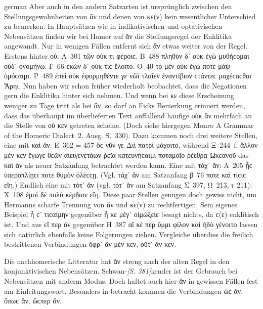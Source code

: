 \begin{otherlanguage*}{german}
Aber auch in den andern Satzarten ist ursprünglich zwischen den Stellungsgewohnheiten von ἄν und denen von κε(ν) kein wesentlicher Unterschied zu bemerken. In Hauptsätzen wie in indikativischen und optativischen Nebensätzen finden wir bei Homer auf ἄν die Stellungsregel der Enklitika angewandt. Nur in wenigen Fällen entfernt sich ἄν etwas weiter von der Regel. Erstens hinter οὐ: Α~301 τῶν οὐκ  τι φέροιϲ. Β~488 πληθὺν δ᾽ οὐκ  ἐγὼ μυθήϲομαι οὐδ᾽ ὀνομήνω. Γ~66 ἑκὼν δ᾽ οὐκ  τιϲ ἕλοιτο. Ο~40 τὸ μὲν οὐκ  ἐγώ ποτε μὰψ ὀμόϲαιμι. Ρ~489 ἐπεὶ οὐκ  ἐφορμηθέντε γε νῶϊ τλαῖεν ἐναντίβιον ϲτάντεϲ μαχέϲαϲθαι Ἄρηι. Nun haben wir schon früher wiederholt beobachtet, dass die Negationen gern die Enklitika hinter sich nehmen. Und wenn bei κε diese Erscheinung weniger zu Tage tritt als bei ἄν, so darf an Ficks Bemerkung erinnert werden, dass das überhaupt im überlieferten Text auffallend häufige οὐκ ἄν mehrfach an die Stelle von οὔ κεν getreten scheine. (Doch siehe hiergegen Monro A Grammar of the Homeric Dialect~2. Ausg. S.~330). Dazu kommen noch drei weitere Stellen, eine mit καὶ ἄν: Ε~362 = 457 ὃϲ νῦν γε  Διὶ πατρὶ μάχοιτο, während Ξ~244~f. ἄλλον μέν κεν ἔγωγε θεῶν αἰειγενετάων ῥεῖα κατευνήϲαιμι  ποταμοῖο ῥέεθρα Ὠκεανοῦ das καὶ ἄν als neuer Satzanfang betrachtet werden kann. Eine mit τάχ᾽ ἄν: Α~205 ᾗϲ ὑπεροπλίῃϲι  ποτε θυμὸν ὀλέϲϲῃ. (Vgl. τάχ᾽ ἄν am Satzanfang β~76  ποτε καὶ τίϲιϲ εἴη.) Endlich eine mit τότ᾽ ἄν (vgl. τότ᾽ ἄν am Satzanfang Σ~397, Ω~213, ι~211): Χ~108 ἐμοὶ δὲ  πολὺ κέρδιον εἴη. Diese paar Stellen genügen doch gewiss nicht, um Hermanns scharfe Trennung von ἄν und κε(ν) zu rechtfertigen. Sein eigenes Beispiel ἦ ϲ᾽  τιϲαίμην gegenüber ἦ κε μέγ᾽ οἰμώξειε besagt nichts, da ϲ(ε) enklitisch ist. Und aus εἴ περ ἄν gegenüber Η~387 αἴ κέ περ ὔμμι φίλον καὶ ἡδὺ γένοιτο lassen sich natürlich ebenfalls keine Folgerungen ziehen. Vergleiche überdies die freilich bestrittenen Verbindungen ὄφρ᾽ ἂν μέν κεν, οὔτ᾽ ἄν κεν.

Die nachhomerische Litteratur hat ἄν streng nach der alten Regel in den konjunktivischen Nebensätzen. Schwan-\hypertarget{p381}{\emph{[S. 381]}}\label{p381}kender ist der Gebrauch bei Nebensätzen mit anderm Modus. Doch haftet auch hier ἄν in gewissen Fällen fest am Einleitungswort. Besonders in betracht kommen die Verbindungen ὡϲ ἄν, ὅπωϲ ἄν, ὥϲπερ ἄν.


\end{otherlanguage*}
